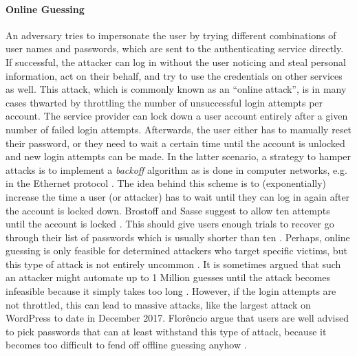 \paragraph{Online Guessing} An adversary tries to impersonate the user by trying different combinations of user names and passwords, which are sent to the authenticating service directly. If successful, the attacker can log in without the user noticing and steal personal information, act on their behalf, and try to use the credentials on other services as well. This attack, which is commonly known as an ``online attack'', is in many cases thwarted by throttling the number of unsuccessful login attempts per account. The service provider can lock down a user account entirely after a given number of failed login attempts. Afterwards, the user either has to manually reset their password, or they need to wait a certain time until the account is unlocked and new login attempts can be made. In the latter scenario, a strategy to hamper attacks is to implement a \textit{backoff} algorithm as is done in computer networks, e.g. in the Ethernet protocol \cite[p. 285]{Tanenbaum2011ComputerNetworks}. The idea behind this scheme is to (exponentially) increase the time a user (or attacker) has to wait until they can log in again after the account is locked down. Brostoff and Sasse suggest to allow ten attempts until the account is locked \cite{Brostoff2003TenStrikes}. This should give users enough trials to recover go through their list of passwords which is usually shorter than ten \cite{Florencio2007LargeScaleStudyPasswordHabits}. Perhaps, online guessing is only feasible for determined attackers who target specific victims, but this type of attack is not entirely uncommon \cite{Florencio2013WhereDoAllTheAttacksGo, Florencio2014PasswordPortfoliosFiniteUser, Herley2015Counterfactuals, Wang2016TargetedGuessingUnderestimated}. It is sometimes argued that such an attacker might automate up to 1 Million guesses until the attack becomes infeasible because it simply takes too long \cite{Bonneau2015ImperfectAuthentication, Florencio2014AdministratorsGuide}. However, if the login attempts are not throttled, this can lead to massive attacks, like the largest attack on WordPress to date in December 2017. Florêncio \etal argue that users are well advised to pick passwords that can at least withstand this type of attack, because it becomes too difficult to fend off offline guessing anyhow \cite{Florencio2014AdministratorsGuide, Florencio2014PasswordPortfoliosFiniteUser, Florencio2016CommACM}. 

